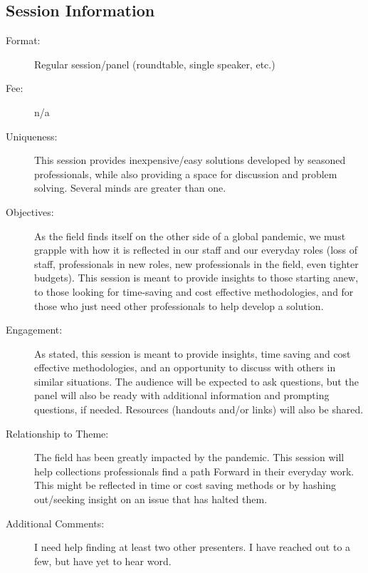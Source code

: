 \documentclass{report}
\begin{document}
              \subsection*{Session Information}
                \begin{description}
                  \item [Format:] Regular session/panel (roundtable, single speaker, etc.)
							    
								  \item [Fee:]n/a
							     
							    \item [Uniqueness:]This session provides inexpensive/easy solutions developed by seasoned professionals, while also providing a space for discussion and problem solving. Several minds are greater than one.
							    \item [Objectives:]As the field finds itself on the other side of a global pandemic, we must grapple with how it is reflected in our staff and our everyday roles (loss of staff, professionals in new roles, new professionals in the field, even tighter budgets). This session is meant to provide insights to those starting anew, to those looking for time-saving and cost effective methodologies, and for those who just need other professionals to help develop a solution.
							    \item [Engagement:]As stated, this session is meant to provide insights, time saving and cost effective methodologies, and an opportunity to discuss with others in similar situations. The audience will be expected to ask questions, but the panel will also be ready with additional information and prompting questions, if needed. Resources (handouts and/or links) will also be shared.
							    \item [Relationship to Theme:]The field has been greatly impacted by the pandemic. This session will help collections professionals find a path Forward in their everyday work. This might be reflected in time or cost saving methods or by hashing out/seeking insight on an issue that has halted them.
							    
                    \item [Additional Comments: ]I need help finding at least two other presenters. I have reached out to a few, but have yet to hear word.

                \end{description}
\end{document}
